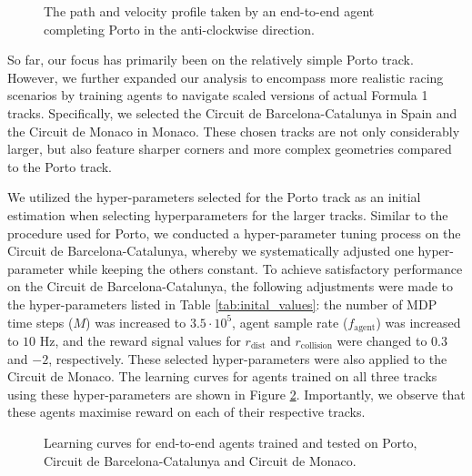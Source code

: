\begin{figure}[htb!]
    \centering
    
    \caption[The path and velocity profile taken by an end-to-end agent completing Porto]{The path and velocity profile taken by an end-to-end agent completing Porto in the anti-clockwise direction.}
    \label{fig:ete_porto}
\end{figure}


So far, our focus has primarily been on the relatively simple Porto track. 
However, we further expanded our analysis to encompass more realistic racing scenarios by training agents to navigate scaled versions of actual Formula 1 tracks. 
Specifically, we selected the Circuit de Barcelona-Catalunya in Spain and the Circuit de Monaco in Monaco. 
These chosen tracks are not only considerably larger, but also feature sharper corners and more complex geometries compared to the Porto track.

We utilized the hyper-parameters selected for the Porto track as an initial estimation when selecting hyperparameters for the larger tracks. Similar to the procedure used for Porto, we conducted a hyper-parameter tuning process on the Circuit de Barcelona-Catalunya, whereby we systematically adjusted one hyper-parameter while keeping the others constant. 
To achieve satisfactory performance on the Circuit de Barcelona-Catalunya, the following adjustments were made to the hyper-parameters listed in Table \ref{tab:inital_values}: the number of MDP time steps ($M$) was increased to $3.5\cdot10^{5}$, agent sample rate ($f_{\text{agent}}$) was increased to $10$ Hz, and the reward signal values for $r_{\text{dist}}$ and  $r_{\text{collision}}$ were changed to $0.3$ and $-2$, respectively.
These selected hyper-parameters were also applied to the Circuit de Monaco.
The learning curves for agents trained on all three tracks using these hyper-parameters are shown in Figure \ref{fig:ete_reward}.
Importantly, we observe that these agents maximise reward on each of their respective tracks.

\begin{figure}[htb!]
    \centering
    
    \caption[Learning curves for end-to-end agents trained and tested on Porto, Circuit de Barcelona-Catalunya and Circuit de Monaco]{Learning curves for end-to-end agents trained and tested on Porto, Circuit de Barcelona-Catalunya and Circuit de Monaco.}
    \label{fig:ete_reward}
\end{figure}


